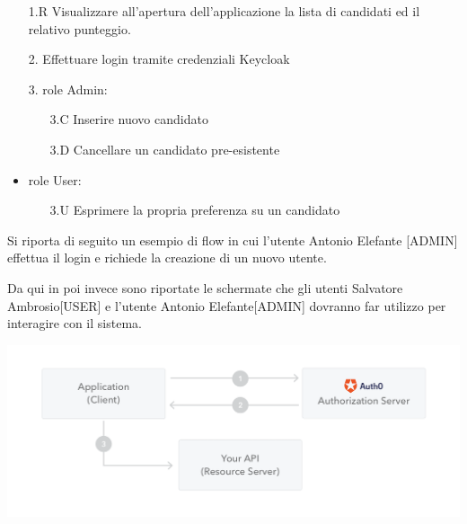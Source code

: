 \documentclass[twoside]{report}
\begin{document}
\begin{itemize}

\item[1.R] Visualizzare all'apertura dell'applicazione la lista di candidati ed il relativo punteggio.
\item[2.] Effettuare login tramite credenziali Keycloak
\item[3.] role Admin:
    \begin{itemize}
        \item[3.C] Inserire nuovo candidato
        \item[3.D] Cancellare un candidato pre-esistente
    \end{itemize}
\item role User:
    \begin{itemize}
        \item[3.U] Esprimere la propria preferenza su un candidato
    \end{itemize}
\end{itemize}

Si riporta di seguito un esempio di flow in cui l'utente Antonio Elefante [ADMIN] effettua il login e richiede la creazione di un nuovo utente.


\newpage

Da qui in poi invece sono riportate le schermate che gli utenti Salvatore Ambrosio[USER] e l'utente Antonio Elefante[ADMIN] dovranno far utilizzo per interagire con il sistema.
\bigbreak
\begin{minipage}{\linewidth}
    \vspace{2mm}
    \centering
    \includegraphics[width= 0.5 \linewidth]{2.png}
    \vspace{2mm}
\end{minipage}
\end{document}

